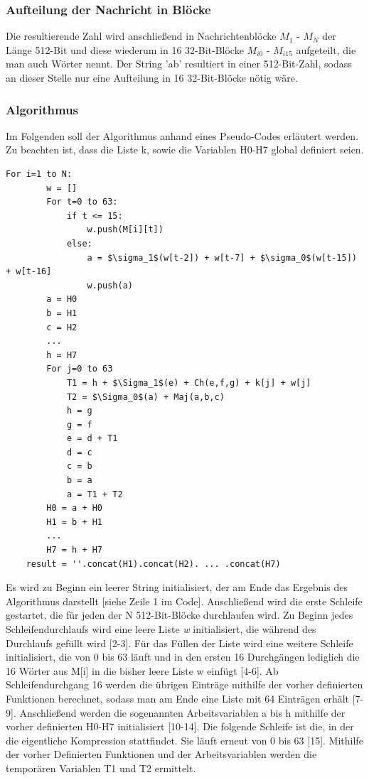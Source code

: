 \subsubsection{Aufteilung der Nachricht in Blöcke}
Die resultierende Zahl wird anschließend in Nachrichtenblöcke $M_1$ - $M_N$ der Länge 512-Bit und diese wiederum in 16 32-Bit-Blöcke $M_{i0}$ - $M_{i15}$ aufgeteilt, die man auch Wörter nennt. Der String 'ab' resultiert in einer 512-Bit-Zahl, sodass an dieser Stelle nur eine Aufteilung in 16 32-Bit-Blöcke nötig wäre.

\subsubsection{Algorithmus}
Im Folgenden soll der Algorithmus anhand eines Pseudo-Codes erläutert werden. Zu beachten ist, dass die Liste k, sowie die Variablen H0-H7 global definiert seien.
\begin{lstlisting}[mathescape,caption={Pseudocode zu SHA256},captionpos=b]
	For i=1 to N:
		w = []
		For t=0 to 63:
			if t <= 15:
				w.push(M[i][t])
			else:
				a = $\sigma_1$(w[t-2]) + w[t-7] + $\sigma_0$(w[t-15]) + w[t-16]
				w.push(a)
		a = H0
		b = H1
		c = H2
		...
		h = H7
		For j=0 to 63
			T1 = h + $\Sigma_1$(e) + Ch(e,f,g) + k[j] + w[j]
			T2 = $\Sigma_0$(a) + Maj(a,b,c)
			h = g
			g = f
			e = d + T1
			d = c
			c = b
			b = a
			a = T1 + T2
		H0 = a + H0
		H1 = b + H1
		...
		H7 = h + H7
	result = ''.concat(H1).concat(H2). ... .concat(H7)
\end{lstlisting}
Es wird zu Beginn ein leerer String initialisiert, der am Ende das Ergebnis des Algorithmus darstellt [siehe Zeile 1 im Code].
Anschließend wird die erste Schleife gestartet, die für jeden der N 512-Bit-Blöcke durchlaufen wird. Zu Beginn jedes Schleifendurchlaufs wird eine leere Liste \emph{w} initialisiert, die während des Durchlaufs gefüllt wird [2-3].
Für das Füllen der Liste wird eine weitere Schleife initialisiert, die von 0 bis 63 läuft und in den ersten 16 Durchgängen lediglich die 16 Wörter aus M[i] in die bisher leere Liste w einfügt [4-6].
Ab Schleifendurchgang 16 werden die übrigen Einträge mithilfe der vorher definierten Funktionen berechnet, sodass man am Ende eine Liste mit 64 Einträgen erhält [7-9].
Anschließend werden die sogenannten Arbeitsvariablen a bis h mithilfe der vorher definierten H0-H7 initialisiert [10-14].
Die folgende Schleife ist die, in der die eigentliche Kompression stattfindet. Sie läuft erneut von 0 bis 63 [15].
Mithilfe der vorher Definierten Funktionen und der Arbeitsvariablen werden die temporären Variablen T1 und T2 ermittelt. 
